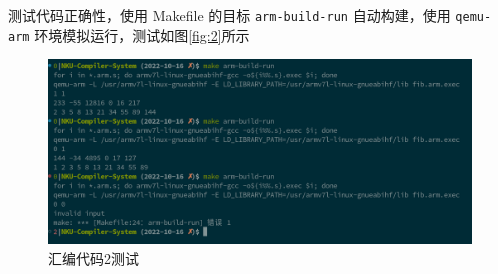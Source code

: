 \documentclass[UTF8,a4paper,10pt]{ctexart}
\begin{document}
测试代码正确性，使用 Makefile 的目标 \verb|arm-build-run| 自动构建，使用 \verb|qemu-arm| 环境模拟运行，测试如图\ref{fig:2}所示

\begin{figure}[H]
  \centering
  \includegraphics[width=1\textwidth]{figure/2.png}
  \caption{汇编代码2测试}
  \label{fig:1}
\end{figure}
\end{document}
